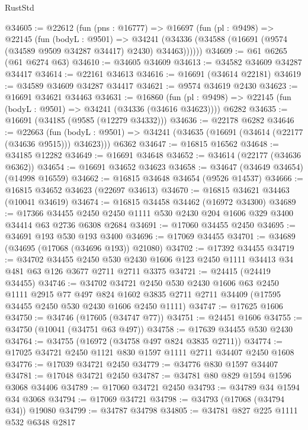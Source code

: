 \begin{lexlean}{RustStd}
\begin{coremodule}
@34605 := @22612
    (fun (pns : @16777) =>
    @16697
      (fun (pl : @9498) =>
      @22145
        (fun (bodyL : @9501) =>
        @34241 (@34336 (@34588 (@16691 (@9574 (@34589 @9509 @34287 @34417) @2430) @34463))))))
@34609 := @61 @6265 (@61 @6274 @63)
@34610 := @34605 @34609
@34613 := @34582 @34609 @34287 @34417
@34614 := @22161 @34613
@34616 := @16691 (@34614 @22181)
@34619 := @34589 @34609 @34287 @34417
@34621 := @9574 @34619 @2430
@34623 := @16691 @34621 @34463
@34631 := @16860
    (fun (pl : @9498) => @22145 (fun (bodyL : @9501) => @34241 (@34336 (@34616 @34623))))
    @6282
@34635 := @16691 (@34185 (@9585 (@12279 @34332)))
@34636 := @22178 @6282
@34646 := @22663
    (fun (bodyL : @9501) => @34241 (@34635 (@16691 (@34614 (@22177 (@34636 @9515))) @34623)))
    @6362
@34647 := @16815 @16562
@34648 := @34185 @12282
@34649 := @16691 @34648
@34652 := @34614 (@22177 (@34636 @6362))
@34654 := @16691 @34652 @34623
@34658 := @34647 (@34649 @34654) (@14998 @16559)
@34662 := @16815 @34648 @34654 (@9526 @14537)
@34666 := @16815 @34652 @34623 (@22697 @34613)
@34670 := @16815 @34621 @34463 (@10041 @34619)
@34674 := @16815 @34458 @34462 (@16972 @34300)
@34689 := @17366
    @34455
    @2450
    @2450
    @1111
    @530
    @2430
    @204
    @1606
    @329
    @3400
    @34414
    @63
    @2736
    @6308
    @2684
@34691 := @17060 @34455 @2450
@34695 := @34691 @193 @530 @193 @3400
@34696 := @17069 @34455
@34701 := @34689 (@34695 (@17068 (@34696 @193)) @21080)
@34702 := @17392 @34455
@34719 := @34702
    @34455
    @2450
    @530
    @2430
    @1606
    @123
    @2450
    @1111
    @34413
    @34
    @481
    @63
    @126
    @3677
    @2711
    @2711
    @3375
@34721 := @24415 (@24419 @34455)
@34746 := @34702
    @34721
    @2450
    @530
    @2430
    @1606
    @63
    @2450
    @1111
    @2915
    @77
    @497
    @824
    @1602
    @3835
    @2711
    @2711
    @34409
    (@17595 @34455 @2450 @530 @2430 @1606 @2450 @1111)
@34747 := @17625 @1606
@34750 := @34746 (@17605 (@34747 @77))
@34751 := @24451 @1606
@34755 := @34750 (@10041 (@34751 @63 @497))
@34758 := @17639 @34455 @530 @2430
@34764 := @34755 (@16972 (@34758 @497 @824 @3835 @2711))
@34774 := @17025 @34721 @2450 @1121 @830 @1597 @1111 @2711 @34407 @2450 @1608
@34776 := @17039 @34721 @2450
@34779 := @34776 @830 @1597 @34407
@34781 := @17048 @34721 @2450
@34787 := @34781 @80 @829 @1594 @1596 @3068 @34406
@34789 := @17060 @34721 @2450
@34793 := @34789 @34 @1594 @34 @3068
@34794 := @17069 @34721
@34798 := @34793 (@17068 (@34794 @34)) @19080
@34799 := @34787 @34798
@34805 := @34781 @827 @225 @1111 @532 @6348 @2817

\end{coremodule}
\end{lexlean}
